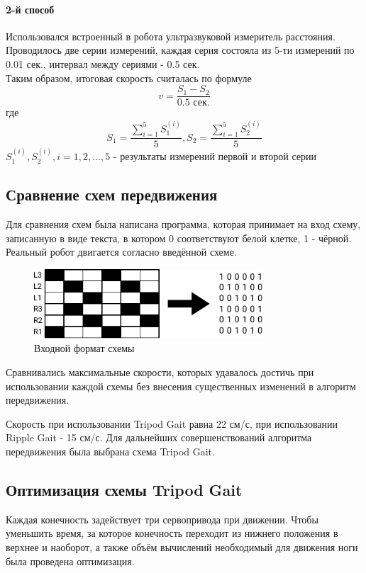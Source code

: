 \documentclass{article}
\begin{document}
\paragraph*{2-й способ}
Использовался встроенный в робота ультразвуковой измеритель расстояния. Проводилось две серии измерений, каждая серия состояла из 5-ти измерений по 0.01 сек., интервал между сериями - 0.5 сек. \\
Таким образом, итоговая скорость считалась по формуле $$v = \frac{S_1-S_2}{0.5\text{ сек.}}$$
где $$S_1 = \frac{\sum_{i=1}^{5} S_1^{(i)}}{5}, S_2 = \frac{\sum_{i=1}^{5} S_2^{(i)}}{5}$$
$S_1^{(i)}, S_2^{(i)}, i=1,2,\ldots,5$ - результаты измерений первой и второй серии

\subsection{Сравнение схем передвижения}

Для сравнения схем была написана программа, которая принимает на вход схему, записанную в виде текста, в котором 0 соответствуют белой клетке, 1 - чёрной. Реальный робот двигается согласно введённой схеме.

\begin{figure}[h]
	\centering
	\includegraphics[height=7em]{gait_program}
	\caption{Входной формат схемы}
	\label{fig:gait_program}
\end{figure}

Сравнивались максимальные скорости, которых удавалось достичь при использовании каждой схемы без внесения существенных изменений в алгоритм передвижения.

Скорость при использовании Tripod Gait равна 22 см/с, при использовании Ripple Gait - 15 см/с. Для дальнейших совершенствований алгоритма передвижения была выбрана схема Tripod Gait.
\subsection{Оптимизация схемы Tripod Gait}

Каждая конечность задействует три сервопривода при движении. Чтобы уменьшить время, за которое конечность переходит из нижнего положения в верхнее и наоборот, а также объём вычислений необходимый для движения ноги была проведена оптимизация.
\end{document}

